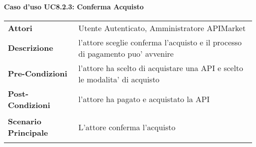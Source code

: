 \paragraph{Caso d'uso UC8.2.3: Conferma Acquisto}
\label{UC8.2.3}

\renewcommand*{\arraystretch}{1.6}
\begin{longtable}{ l | p{11cm}}
	\hline
	\rowcolor{Gray}
	\multicolumn{2}{c}{UC8.2.3: Conferma Acquisto} \\
	\hline
	\textbf{Attori} &Utente Autenticato, Amministratore APIMarket \\
	\textbf{Descrizione} & l'attore sceglie conferma l'acquisto e il processo di pagamento puo' avvenire\\
	\textbf{Pre-Condizioni} &  l'attore ha scelto di acquistare una API e scelto le modalita' di acquisto\\
	\textbf{Post-Condizioni}& l'attore ha pagato e acquistato la API\\
	\textbf{Scenario Principale} & \begin{enumerate*}[label=(\arabic*.),itemjoin={\newline}]
		\item L'attore conferma l'acquisto
	\end{enumerate*}\\
\end{longtable}
